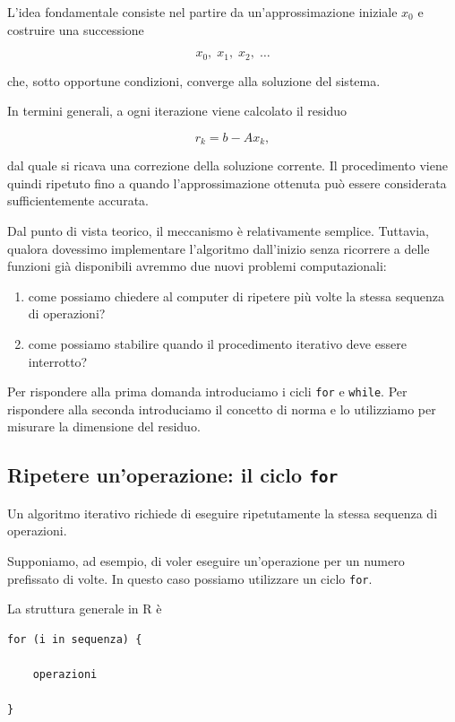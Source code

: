 L'idea fondamentale consiste nel partire da un'approssimazione
iniziale $x_0$ e costruire una successione

\begin{equation*}
    x_0,\;x_1,\;x_2,\;\ldots
\end{equation*}

che, sotto opportune condizioni, converge alla soluzione del sistema.

In termini generali, a ogni iterazione viene calcolato il residuo

\begin{equation*}
    r_k=b-Ax_k,
\end{equation*}

dal quale si ricava una correzione della soluzione corrente.
Il procedimento viene quindi ripetuto fino a quando
l'approssimazione ottenuta può essere considerata sufficientemente
accurata.

Dal punto di vista teorico, il meccanismo è relativamente semplice.
Tuttavia, qualora dovessimo implementare l'algoritmo dall'inizio senza ricorrere a delle funzioni già disponibili avremmo due nuovi problemi computazionali:

\begin{enumerate}
    \item come possiamo chiedere al computer di ripetere più volte
          la stessa sequenza di operazioni?
    \item come possiamo stabilire quando il procedimento iterativo
          deve essere interrotto?
\end{enumerate}

Per rispondere alla prima domanda introduciamo i cicli
\texttt{for} e \texttt{while}. Per rispondere alla seconda
introduciamo il concetto di norma e lo utilizziamo per misurare
la dimensione del residuo.


\subsection{Ripetere un'operazione: il ciclo \texttt{for}}

Un algoritmo iterativo richiede di eseguire ripetutamente la stessa
sequenza di operazioni.

Supponiamo, ad esempio, di voler eseguire un'operazione per un numero
prefissato di volte. In questo caso possiamo utilizzare un ciclo
\texttt{for}.

La struttura generale in \textsf{R} è

\begin{verbatim}
for (i in sequenza) {

    operazioni

}
\end{verbatim}

